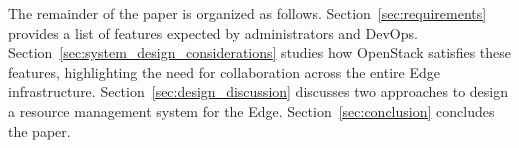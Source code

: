 The remainder of the paper is organized as follows.
Section~\ref{sec:requirements} provides a list of features expected by administrators
and DevOps.
Section~\ref{sec:system_design_considerations} studies how OpenStack satisfies
these features, highlighting the need for collaboration across the
entire Edge infrastructure. Section~\ref{sec:design_discussion} discusses two
approaches to design a resource management system for the Edge.
Section~\ref{sec:conclusion} concludes the paper.

